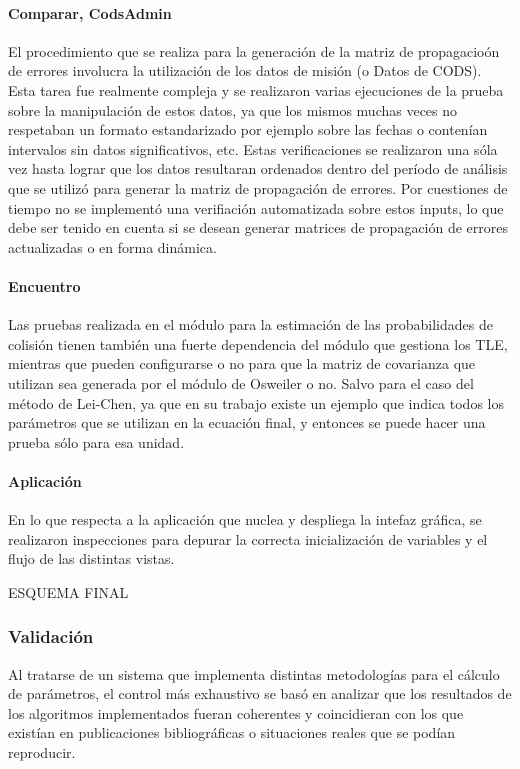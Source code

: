 \paragraph{Comparar, CodsAdmin}
El procedimiento que se realiza para la generaci\'on de la matriz de propagacio\'on de errores involucra la utilizaci\'on de los datos de misi\'on (o Datos de CODS). Esta tarea fue realmente compleja y se realizaron varias ejecuciones de la prueba sobre la manipulaci\'on de estos datos, ya que los mismos muchas veces no respetaban un formato estandarizado por ejemplo sobre las fechas o conten\'ian intervalos sin datos significativos, etc. Estas verificaciones se realizaron una s\'ola vez hasta lograr que los datos resultaran ordenados dentro del per\'iodo de an\'alisis que se utiliz\'o para generar la matriz de propagaci\'on de errores. Por cuestiones de tiempo no se implement\'o una verifiaci\'on automatizada sobre estos inputs, lo que debe ser tenido en cuenta si se desean generar matrices de propagaci\'on de errores actualizadas o en forma din\'amica.  

\paragraph{Encuentro}
Las pruebas realizada en el m\'odulo para la estimaci\'on de las probabilidades de colisi\'on tienen tambi\'en una fuerte dependencia del m\'odulo que gestiona los TLE, mientras que pueden configurarse o no para que la matriz de covarianza que utilizan sea generada por el m\'odulo de Osweiler o no. Salvo para el caso del m\'etodo de Lei-Chen, ya que en su trabajo existe un ejemplo que indica todos los par\'ametros que se utilizan en la ecuaci\'on final, y entonces se puede hacer una prueba s\'olo para esa unidad.

\paragraph{Aplicaci\'on}
En lo que respecta a la aplicaci\'on que nuclea y despliega la intefaz gr\'afica, se realizaron inspecciones para depurar la correcta inicializaci\'on de variables y el flujo de las distintas vistas. 


ESQUEMA FINAL\\

\subsubsection{Validaci\'on}

Al tratarse de un sistema que implementa distintas metodolog\'ias para el c\'alculo de par\'ametros, el control m\'as exhaustivo se bas\'o en analizar que los resultados de los algoritmos implementados fueran coherentes y coincidieran con los que exist\'ian en publicaciones bibliogr\'aficas o situaciones reales que se pod\'ian reproducir. 


